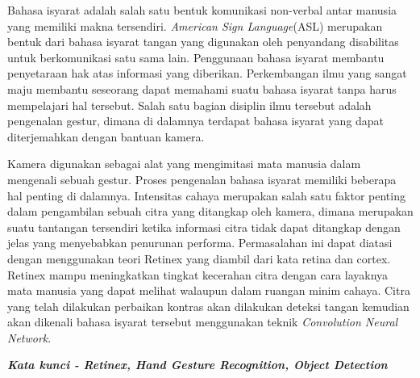 \documentclass{tesisilkomugm}
\begin{document}
\begin{abstractind}
Bahasa isyarat adalah salah satu bentuk komunikasi non-verbal antar manusia yang memiliki makna tersendiri. \emph{American Sign Language}(ASL) merupakan bentuk dari bahasa isyarat tangan yang digunakan oleh penyandang disabilitas untuk berkomunikasi satu sama lain. Penggunaan bahasa isyarat membantu penyetaraan hak atas informasi yang diberikan. Perkembangan ilmu yang sangat maju membantu seseorang dapat memahami suatu bahasa isyarat tanpa harus mempelajari hal tersebut. Salah satu bagian disiplin ilmu tersebut adalah pengenalan gestur, dimana di dalamnya terdapat bahasa isyarat yang dapat diterjemahkan dengan bantuan kamera.

Kamera digunakan sebagai alat yang mengimitasi mata manusia dalam mengenali sebuah gestur. Proses pengenalan bahasa isyarat memiliki beberapa hal penting di dalamnya. Intensitas cahaya merupakan salah satu faktor penting dalam pengambilan sebuah citra yang ditangkap oleh kamera, dimana merupakan suatu tantangan tersendiri ketika informasi citra tidak dapat ditangkap dengan jelas yang menyebabkan penurunan performa. Permasalahan ini dapat diatasi dengan menggunakan teori Retinex yang diambil dari kata retina dan cortex. Retinex mampu meningkatkan tingkat kecerahan citra dengan cara layaknya mata manusia yang dapat melihat walaupun dalam ruangan minim cahaya. Citra yang telah dilakukan perbaikan kontras akan dilakukan deteksi tangan kemudian akan dikenali bahasa isyarat tersebut menggunakan teknik \emph{Convolution Neural Network}.

\textbf{\emph{Kata kunci - Retinex, Hand Gesture Recognition, Object Detection} }
\end{abstractind}
\end{document}
